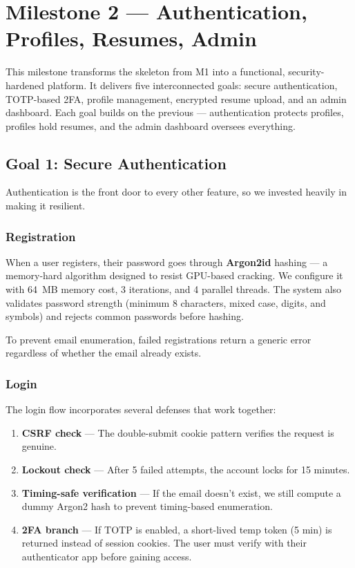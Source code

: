 
\section{Milestone 2 — Authentication, Profiles, Resumes, Admin}
\label{sec:milestone2}

This milestone transforms the skeleton from M1 into a functional, security-hardened platform. It delivers five interconnected goals: secure authentication, TOTP-based 2FA, profile management, encrypted resume upload, and an admin dashboard. Each goal builds on the previous — authentication protects profiles, profiles hold resumes, and the admin dashboard oversees everything.

\subsection{Goal 1: Secure Authentication}

Authentication is the front door to every other feature, so we invested heavily in making it resilient.

\subsubsection{Registration}

When a user registers, their password goes through \textbf{Argon2id} hashing — a memory-hard algorithm designed to resist GPU-based cracking. We configure it with 64~MB memory cost, 3 iterations, and 4 parallel threads. The system also validates password strength (minimum 8 characters, mixed case, digits, and symbols) and rejects common passwords before hashing.

To prevent email enumeration, failed registrations return a generic error regardless of whether the email already exists.

\subsubsection{Login}

The login flow incorporates several defenses that work together:

\begin{enumerate}
    \item \textbf{CSRF check} — The double-submit cookie pattern verifies the request is genuine.
    \item \textbf{Lockout check} — After 5 failed attempts, the account locks for 15 minutes.
    \item \textbf{Timing-safe verification} — If the email doesn't exist, we still compute a dummy Argon2 hash to prevent timing-based enumeration.
    \item \textbf{2FA branch} — If TOTP is enabled, a short-lived temp token (5 min) is returned instead of session cookies. The user must verify with their authenticator app before gaining access.
\end{enumerate}

